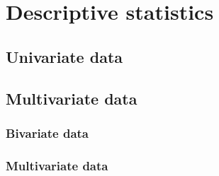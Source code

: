 \chapter{Descriptive statistics}
\section{Univariate data}
\section{Multivariate data}
\subsection{Bivariate data}
\subsection{Multivariate data}